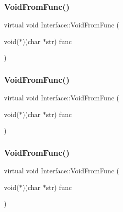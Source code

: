 \mbox{\label{class_interface_a7dab3c82b857a9a5f52b3ce6f7df547f}} 
\subsubsection{\texorpdfstring{VoidFromFunc()}{VoidFromFunc()}\hspace{0.1cm}{\footnotesize\ttfamily [1/3]}}
{\footnotesize\ttfamily virtual void Interface\+::\+Void\+From\+Func (\begin{DoxyParamCaption}\item[{void($\ast$)(char $\ast$str)}]{func }\end{DoxyParamCaption})\hspace{0.3cm}{\ttfamily [pure virtual]}}

\mbox{\label{class_interface_a7dab3c82b857a9a5f52b3ce6f7df547f}} 
\subsubsection{\texorpdfstring{VoidFromFunc()}{VoidFromFunc()}\hspace{0.1cm}{\footnotesize\ttfamily [2/3]}}
{\footnotesize\ttfamily virtual void Interface\+::\+Void\+From\+Func (\begin{DoxyParamCaption}\item[{void($\ast$)(char $\ast$str)}]{func }\end{DoxyParamCaption})\hspace{0.3cm}{\ttfamily [pure virtual]}}

\mbox{\label{class_interface_a7dab3c82b857a9a5f52b3ce6f7df547f}} 
\subsubsection{\texorpdfstring{VoidFromFunc()}{VoidFromFunc()}\hspace{0.1cm}{\footnotesize\ttfamily [3/3]}}
{\footnotesize\ttfamily virtual void Interface\+::\+Void\+From\+Func (\begin{DoxyParamCaption}\item[{void($\ast$)(char $\ast$str)}]{func }\end{DoxyParamCaption})\hspace{0.3cm}{\ttfamily [pure virtual]}}

